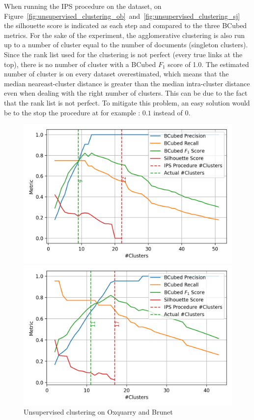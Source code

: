 When running the IPS procedure on the dataset, on Figure~\ref{fig:unsupervised_clustering_ob}~and~\ref{fig:unsupervised_clustering_sj} the silhouette score is indicated as each step and compared to the three BCubed metrics.
For the sake of the experiment, the agglomerative clustering is also run up to a number of cluster equal to the number of documents (singleton clusters).
Since the rank list used for the clustering is not perfect (every true links at the top), there is no number of cluster with a BCubed $F_1$ score of 1.0.
The estimated number of cluster is on every dataset overestimated, which means that the median neareast-cluster distance is greater than the median intra-cluster distance even when dealing with the right number of clusters.
This can be due to the fact that the rank list is not perfect.
To mitigate this problem, an easy solution would be to the stop the procedure at for example : $0.1$ instead of $0$.

\begin{figure}
  \caption{Unsupervised clustering on Oxquarry and Brunet}
  \label{fig:unsupervised_clustering_ob}

  \label{fig:unsupervised_clustering_oxquarry}
  \includegraphics[width=\linewidth]{img/unsupervised_clustering_oxquarry.png}

  \label{fig:unsupervised_clustering_brunet}
  \includegraphics[width=\linewidth]{img/unsupervised_clustering_brunet.png}
\end{figure}


